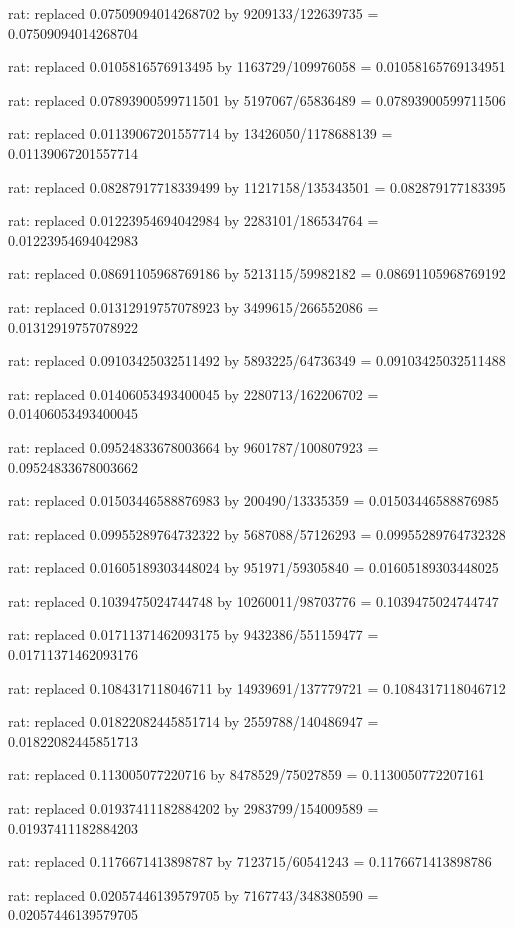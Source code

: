 \documentclass[a4paper,10pt]{article}
\begin{document}
\begin{eulernotebook}
\begin{eulercomment}
\begin{eulercomment}
\begin{eulercomment}
\begin{eulercomment}
\begin{eulercomment}
\begin{eulercomment}
\begin{eulercomment}
\begin{eulercomment}
\begin{eulercomment}
\begin{eulercomment}
\begin{eulercomment}
\begin{eulercomment}
\begin{eulercomment}
\begin{eulercomment}
\begin{eulercomment}
\begin{eulercomment}
\begin{euleroutput}
  rat: replaced 0.07509094014268702 by 9209133/122639735 = 0.07509094014268704
  
  rat: replaced 0.0105816576913495 by 1163729/109976058 = 0.01058165769134951
  
  rat: replaced 0.07893900599711501 by 5197067/65836489 = 0.07893900599711506
  
  rat: replaced 0.01139067201557714 by 13426050/1178688139 = 0.01139067201557714
  
  rat: replaced 0.08287917718339499 by 11217158/135343501 = 0.082879177183395
  
  rat: replaced 0.01223954694042984 by 2283101/186534764 = 0.01223954694042983
  
  rat: replaced 0.08691105968769186 by 5213115/59982182 = 0.08691105968769192
  
  rat: replaced 0.01312919757078923 by 3499615/266552086 = 0.01312919757078922
  
  rat: replaced 0.09103425032511492 by 5893225/64736349 = 0.09103425032511488
  
  rat: replaced 0.01406053493400045 by 2280713/162206702 = 0.01406053493400045
  
  rat: replaced 0.09524833678003664 by 9601787/100807923 = 0.09524833678003662
  
  rat: replaced 0.01503446588876983 by 200490/13335359 = 0.01503446588876985
  
  rat: replaced 0.09955289764732322 by 5687088/57126293 = 0.09955289764732328
  
  rat: replaced 0.01605189303448024 by 951971/59305840 = 0.01605189303448025
  
  rat: replaced 0.1039475024744748 by 10260011/98703776 = 0.1039475024744747
  
  rat: replaced 0.01711371462093175 by 9432386/551159477 = 0.01711371462093176
  
  rat: replaced 0.1084317118046711 by 14939691/137779721 = 0.1084317118046712
  
  rat: replaced 0.01822082445851714 by 2559788/140486947 = 0.01822082445851713
  
  rat: replaced 0.113005077220716 by 8478529/75027859 = 0.1130050772207161
  
  rat: replaced 0.01937411182884202 by 2983799/154009589 = 0.01937411182884203
  
  rat: replaced 0.1176671413898787 by 7123715/60541243 = 0.1176671413898786
  
  rat: replaced 0.02057446139579705 by 7167743/348380590 = 0.02057446139579705
  

\end{euleroutput}
\end{eulercomment}
\end{eulercomment}
\end{eulercomment}
\end{eulercomment}
\end{eulercomment}
\end{eulercomment}
\end{eulercomment}
\end{eulercomment}
\end{eulercomment}
\end{eulercomment}
\end{eulercomment}
\end{eulercomment}
\end{eulercomment}
\end{eulercomment}
\end{eulercomment}
\end{eulercomment}
\end{eulernotebook}
\end{document}
